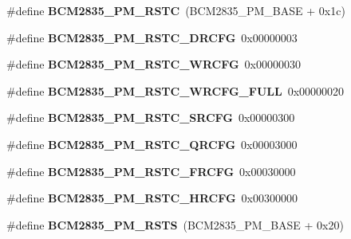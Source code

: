 \begin{DoxyCompactItemize}
\item 
\mbox{\label{group__raspberrypi__reg_ga59079cf9f6ac228182ac15a1c57c188c}} 
\#define {\bfseries B\+C\+M2835\+\_\+\+P\+M\+\_\+\+R\+S\+TC}~(B\+C\+M2835\+\_\+\+P\+M\+\_\+\+B\+A\+SE + 0x1c)
\item 
\mbox{\label{group__raspberrypi__reg_ga9c59d694aeb8efec7f5a340afeb937ec}} 
\#define {\bfseries B\+C\+M2835\+\_\+\+P\+M\+\_\+\+R\+S\+T\+C\+\_\+\+D\+R\+C\+FG}~0x00000003
\item 
\mbox{\label{group__raspberrypi__reg_ga9871c4a14833addc2291a6fd56231a87}} 
\#define {\bfseries B\+C\+M2835\+\_\+\+P\+M\+\_\+\+R\+S\+T\+C\+\_\+\+W\+R\+C\+FG}~0x00000030
\item 
\mbox{\label{group__raspberrypi__reg_gaac71e7a31141a87d59608e7a976b099c}} 
\#define {\bfseries B\+C\+M2835\+\_\+\+P\+M\+\_\+\+R\+S\+T\+C\+\_\+\+W\+R\+C\+F\+G\+\_\+\+F\+U\+LL}~0x00000020
\item 
\mbox{\label{group__raspberrypi__reg_gad9ad782b1b22c54c71ccd56a8d3235c6}} 
\#define {\bfseries B\+C\+M2835\+\_\+\+P\+M\+\_\+\+R\+S\+T\+C\+\_\+\+S\+R\+C\+FG}~0x00000300
\item 
\mbox{\label{group__raspberrypi__reg_ga89bf421c59e67ea5305bda03dfc904ea}} 
\#define {\bfseries B\+C\+M2835\+\_\+\+P\+M\+\_\+\+R\+S\+T\+C\+\_\+\+Q\+R\+C\+FG}~0x00003000
\item 
\mbox{\label{group__raspberrypi__reg_ga4475449a79d86ad743cd69241110a20e}} 
\#define {\bfseries B\+C\+M2835\+\_\+\+P\+M\+\_\+\+R\+S\+T\+C\+\_\+\+F\+R\+C\+FG}~0x00030000
\item 
\mbox{\label{group__raspberrypi__reg_ga90ea94054e997ac3cfd4509d0649e936}} 
\#define {\bfseries B\+C\+M2835\+\_\+\+P\+M\+\_\+\+R\+S\+T\+C\+\_\+\+H\+R\+C\+FG}~0x00300000
\item 
\mbox{\label{group__raspberrypi__reg_ga757428b6033d415e7bf4fa2fd81a7377}} 
\#define {\bfseries B\+C\+M2835\+\_\+\+P\+M\+\_\+\+R\+S\+TS}~(B\+C\+M2835\+\_\+\+P\+M\+\_\+\+B\+A\+SE + 0x20)

\end{DoxyCompactItemize}
